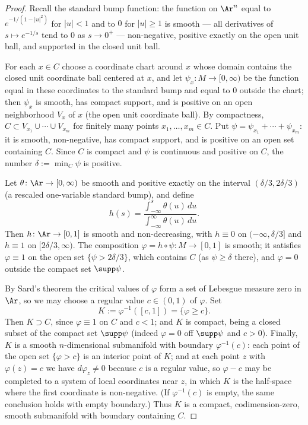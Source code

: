 \begin{proof}
Recall the standard bump function: the function on $\Ar^n$ equal to
$e^{-1/(1-|u|^2)}$ for $|u|<1$ and to $0$ for $|u|\ge1$ is smooth ---
all derivatives of $s\mapsto e^{-1/s}$ tend to $0$ as
$s\rightarrow0^+$ --- non-negative, positive exactly on the open unit
ball, and supported in the closed unit ball.

For each $x\in C$ choose a coordinate chart around $x$ whose domain
contains the closed unit coordinate ball centered at $x$, and let
$\psi_x\colon M\to[0,\infty)$ be the function equal in these
coordinates to the standard bump and equal to $0$ outside the chart;
then $\psi_x$ is smooth, has compact support, and is positive on an
open neighborhood $V_x$ of $x$ (the open unit coordinate ball). By
compactness, $C\subset V_{x_1}\cup\cdots\cup V_{x_m}$ for finitely
many points $x_1,\dots,x_m\in C$. Put
$\psi=\psi_{x_1}+\cdots+\psi_{x_m}$: it is smooth, non-negative, has
compact support, and is positive on an open set containing $C$. Since
$C$ is compact and $\psi$ is continuous and positive on $C$, the
number $\delta:=\min_C\psi$ is positive.

Let $\theta\colon\Ar\to[0,\infty)$ be smooth and positive exactly on
the interval $(\delta/3,2\delta/3)$ (a rescaled one-variable standard
bump), and define
$$h(s)=\frac{\int_{-\infty}^{s}\theta(u)\,du}
{\int_{-\infty}^{\infty}\theta(u)\,du}.$$
Then $h\colon\Ar\to[0,1]$ is smooth and non-decreasing, with
$h\equiv0$ on $(-\infty,\delta/3]$ and $h\equiv1$ on
$[2\delta/3,\infty)$. The composition $\varphi=h\circ\psi\colon
M\to[0,1]$ is smooth; it satisfies $\varphi\equiv1$ on the open set
$\{\psi>2\delta/3\}$, which contains $C$ (as $\psi\ge\delta$ there),
and $\varphi=0$ outside the compact set $\supp\psi$.

By Sard's theorem the critical values of $\varphi$ form a set of
Lebesgue measure zero in $\Ar$, so we may choose a regular value
$c\in(0,1)$ of $\varphi$. Set
$$K:=\varphi^{-1}([c,1])=\{\varphi\ge c\}.$$
Then $K\supset C$, since $\varphi\equiv1$ on $C$ and $c<1$; and $K$
is compact, being a closed subset of the compact set $\supp\psi$
(indeed $\varphi=0$ off $\supp\psi$ and $c>0$). Finally, $K$ is a
smooth $n$-dimensional submanifold with boundary
$\varphi^{-1}(c)$: each point of the open set $\{\varphi>c\}$ is an
interior point of $K$; and at each point $z$ with $\varphi(z)=c$ we
have $d\varphi_z\neq0$ because $c$ is a regular value, so
$\varphi-c$ may be completed to a system of local coordinates near
$z$, in which $K$ is the half-space where the first coordinate is
non-negative. (If $\varphi^{-1}(c)$ is empty, the same conclusion
holds with empty boundary.) Thus $K$ is a compact, codimension-zero,
smooth submanifold with boundary containing $C$.
\end{proof}


